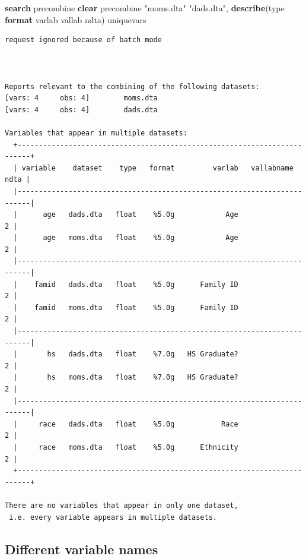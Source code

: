 \documentclass[
]{book}
\newenvironment{Shaded}{\begin{snugshade}}{\end{snugshade}}
\newcommand{\DecValTok}[1]{\textcolor[rgb]{0.00,0.00,0.81}{#1}}
\newcommand{\KeywordTok}[1]{\textcolor[rgb]{0.13,0.29,0.53}{\textbf{#1}}}
\newcommand{\NormalTok}[1]{#1}
\newcommand{\StringTok}[1]{\textcolor[rgb]{0.31,0.60,0.02}{#1}}
\begin{document}
\begin{Shaded}
\begin{Highlighting}[]
\KeywordTok{search}\NormalTok{ precombine}
\KeywordTok{clear}
\NormalTok{precombine }\StringTok{"moms.dta"} \StringTok{"dads.dta"}\NormalTok{, }\KeywordTok{describe}\NormalTok{(}\DecValTok{type} \KeywordTok{format}\NormalTok{ varlab vallab ndta) uniquevars}
\end{Highlighting}
\end{Shaded}

\begin{verbatim}
request ignored because of batch mode



Reports relevant to the combining of the following datasets:
[vars: 4     obs: 4]        moms.dta
[vars: 4     obs: 4]        dads.dta

Variables that appear in multiple datasets:
  +-------------------------------------------------------------------------+
  | variable    dataset    type   format         varlab   vallabname   ndta |
  |-------------------------------------------------------------------------|
  |      age   dads.dta   float    %5.0g            Age                   2 |
  |      age   moms.dta   float    %5.0g            Age                   2 |
  |-------------------------------------------------------------------------|
  |    famid   dads.dta   float    %5.0g      Family ID                   2 |
  |    famid   moms.dta   float    %5.0g      Family ID                   2 |
  |-------------------------------------------------------------------------|
  |       hs   dads.dta   float    %7.0g   HS Graduate?                   2 |
  |       hs   moms.dta   float    %7.0g   HS Graduate?                   2 |
  |-------------------------------------------------------------------------|
  |     race   dads.dta   float    %5.0g           Race                   2 |
  |     race   moms.dta   float    %5.0g      Ethnicity                   2 |
  +-------------------------------------------------------------------------+

There are no variables that appear in only one dataset, 
 i.e. every variable appears in multiple datasets. 
\end{verbatim}

\subsection{Different variable names}\label{different-variable-names}
\end{document}
